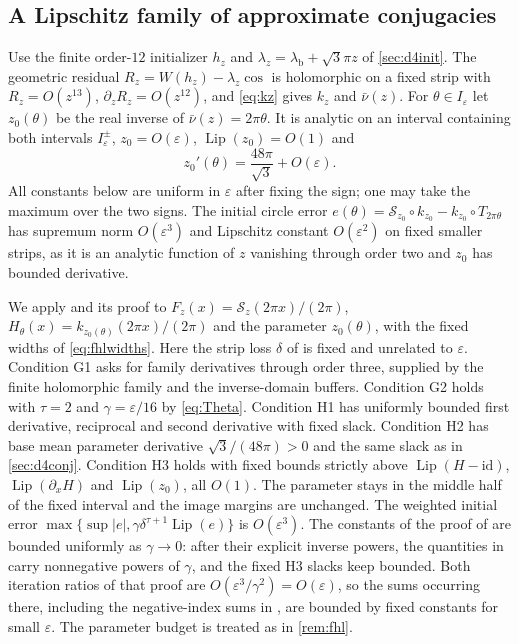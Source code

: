 \documentclass[11pt]{amsart}
\numberwithin{equation}{section}
\theoremstyle{definition}
\theoremstyle{remark}
\newcommand{\eps}{\varepsilon}
\newcommand{\abs}[1]{\lvert #1\rvert}
\newcommand{\Lip}{\operatorname{Lip}}
\newcommand{\id}{\mathrm{id}}
\newcommand{\lb}{\lambda_{\mathrm b}}
\begin{document}
\subsection{A Lipschitz family of approximate conjugacies}
Use the finite order-$12$ initializer $h_z$ and $\lambda_z=\lb+\sqrt3\pi z$ of \cref{sec:d4init}. The geometric residual $R_z=W(h_z)-\lambda_z\cos$ is holomorphic on a fixed strip with $R_z=O(z^{13})$, $\partial_zR_z=O(z^{12})$, and \eqref{eq:kz} gives $k_z$ and $\bar\nu(z)$. For $\theta\in I_\eps$ let $z_0(\theta)$ be the real inverse of $\bar\nu(z)=2\pi\theta$. It is analytic on an interval containing both intervals $I_\eps^\pm$, $z_0=O(\eps)$, $\Lip(z_0)=O(1)$ and
\begin{equation}\label{eq:z0prime}
z_0'(\theta)=\frac{48\pi}{\sqrt3}+O(\eps).
\end{equation}
All constants below are uniform in $\eps$ after fixing the sign; one may take the maximum over the two signs. The initial circle error $e(\theta)=\mathcal S_{z_0}\circ k_{z_0}-k_{z_0}\circ T_{2\pi\theta}$ has supremum norm $O(\eps^3)$ and Lipschitz constant $O(\eps^2)$ on fixed smaller strips, as it is an analytic function of $z$ vanishing through order two and $z_0$ has bounded derivative.

We apply \cite[Theorem~4.1]{FHL} and its proof to $F_z(x)=\mathcal S_z(2\pi x)/(2\pi)$, $H_\theta(x)=k_{z_0(\theta)}(2\pi x)/(2\pi)$ and the parameter $z_0(\theta)$, with the fixed widths of \eqref{eq:fhlwidths}. Here the strip loss $\delta$ of \cite{FHL} is fixed and unrelated to $\eps$. Condition G1 asks for family derivatives through order three, supplied by the finite holomorphic family and the inverse-domain buffers. Condition G2 holds with $\tau=2$ and $\gamma=\eps/16$ by \eqref{eq:Theta}. Condition H1 has uniformly bounded first derivative, reciprocal and second derivative with fixed slack. Condition H2 has base mean parameter derivative $\sqrt3/(48\pi)>0$ and the same slack as in \cref{sec:d4conj}. Condition H3 holds with fixed bounds strictly above $\Lip(H-\id)$, $\Lip(\partial_xH)$ and $\Lip(z_0)$, all $O(1)$. The parameter stays in the middle half of the fixed interval and the image margins are unchanged. The weighted initial error $\max\{\sup\abs e,\gamma\delta^{\tau+1}\Lip(e)\}$ is $O(\eps^3)$. The constants of the proof of \cite[Theorem~4.1]{FHL} are bounded uniformly as $\gamma\to0$: after their explicit inverse powers, the quantities in \cite[(4.9)--(4.13), (4.20), (4.31), (4.34), (4.37)]{FHL} carry nonnegative powers of $\gamma$, and the fixed H3 slacks keep \cite[(4.39)]{FHL} bounded. Both iteration ratios of that proof are $O(\eps^3/\gamma^2)=O(\eps)$, so the sums occurring there, including the negative-index sums in \cite[(4.33) and (4.35)]{FHL}, are bounded by fixed constants for small $\eps$. The parameter budget is treated as in \cref{rem:fhl}.
\end{document}
